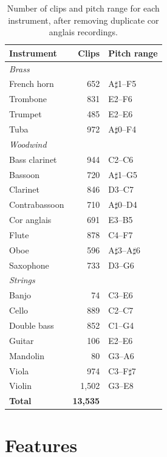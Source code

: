 \documentclass[11pt]{article}
\begin{document}
\begin{table}[t]
  \centering
  \small
  \begin{tabular}{lrl}
    \hline
    \textbf{Instrument} & \textbf{Clips} & \textbf{Pitch range} \\
    \hline
    \multicolumn{3}{l}{\textit{Brass}} \\
    French horn    & 652   & A$\sharp$1--F5 \\
    Trombone       & 831   & E2--F6 \\
    Trumpet        & 485   & E2--E6 \\
    Tuba           & 972   & A$\sharp$0--F4 \\
    \hline
    \multicolumn{3}{l}{\textit{Woodwind}} \\
    Bass clarinet  & 944   & C2--C6 \\
    Bassoon        & 720   & A$\sharp$1--G5 \\
    Clarinet       & 846   & D3--C7 \\
    Contrabassoon  & 710   & A$\sharp$0--D4 \\
    Cor anglais    & 691   & E3--B5 \\
    Flute          & 878   & C4--F7 \\
    Oboe           & 596   & A$\sharp$3--A$\sharp$6 \\
    Saxophone      & 733   & D3--G6 \\
    \hline
    \multicolumn{3}{l}{\textit{Strings}} \\
    Banjo          & 74    & C3--E6 \\
    Cello          & 889   & C2--C7 \\
    Double bass    & 852   & C1--G4 \\
    Guitar         & 106   & E2--E6 \\
    Mandolin       & 80    & G3--A6 \\
    Viola          & 974   & C3--F$\sharp$7 \\
    Violin         & 1,502 & G3--E8 \\
    \hline
    \textbf{Total} & \textbf{13,535} & \\
    \hline
  \end{tabular}
  \caption{\label{tab:dataset}
    Number of clips and pitch range for each instrument, after removing duplicate cor anglais recordings.
  }
\end{table}
\section{Features}
\label{sec:features}
\end{document}
